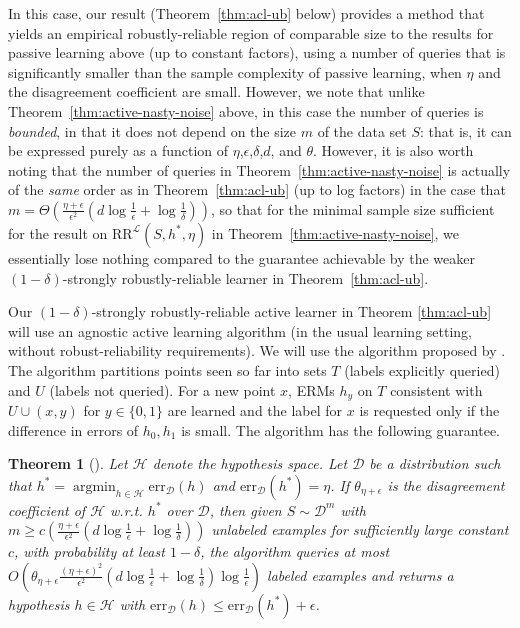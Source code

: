 \documentclass[11pt]{article}
\newcommand{\CR}{\text{RR}}
\newcommand{\err}{\mathrm{err}}
\newtheorem{theorem}{Theorem}[section]
\newcommand{\0}{\mathbf{0}}
\newcommand{\1}{\mathbf{1}}
\newcommand{\cD}{\mathcal{D}}
\newcommand{\cH}{\mathcal{H}}
\newcommand{\cL}{\mathcal{L}}
\DeclareMathOperator*{\argmin}{argmin}
\begin{document}
In this case, our result (Theorem~\ref{thm:acl-ub} below) provides a method that yields
an empirical robustly-reliable region of
comparable size to the results for passive
learning above (up to constant factors),
using a number of queries that is significantly
smaller than the sample complexity of passive learning,
when $\eta$ and the disagreement coefficient are
small.  However, we note that unlike
Theorem~\ref{thm:active-nasty-noise} above,
in this case the number of queries is
\emph{bounded}, in that it does not depend on
the size $m$ of the data set $S$:
that is, it can be expressed purely as a function
of
$\eta$,$\epsilon$,$\delta$,$d$, and $\theta$.
However, it is also worth noting that the number of queries
in Theorem~\ref{thm:active-nasty-noise} is
actually of the \emph{same} order as in Theorem~\ref{thm:acl-ub} (up to log factors)
in the case that
$m = \Theta\!\left( \frac{\eta+\epsilon}{\epsilon^2} \left( d \log\frac{1}{\epsilon}+\log\frac{1}{\delta}\right) \right)$,
so that for the minimal sample size sufficient for the
result on $\CR^{\cL}(S,h^*,\eta)$ in Theorem~\ref{thm:active-nasty-noise}, we essentially lose
nothing compared to the guarantee achievable by the
weaker $(1-\delta)$-strongly robustly-reliable learner
in Theorem~\ref{thm:acl-ub}.




Our $(1-\delta)$-strongly robustly-reliable active learner in Theorem \ref{thm:acl-ub} will use an agnostic active learning algorithm (in the usual learning setting, without robust-reliability requirements). We will use the algorithm proposed by \cite{dasgupta2007general}. The algorithm partitions points seen so far into sets $T$ (labels explicitly queried) and $U$ (labels not queried). For a new point $x$, ERMs $h_y$ on $T$ consistent with $U\cup(x,y)$ for $y\in\{0,1\}$ are learned and the label for $x$ is requested only if the difference in errors of $h_0,h_1$ is small. The algorithm has the following guarantee.

\begin{theorem}[\cite{dasgupta2007general}]\label{thm:dasgupta_aa}
Let $\cH$ denote the hypothesis space. Let ${\cD}$ be a distribution such that ${h}^*=\argmin_{h\in\cH}\err_\cD(h)$ and $\err_\cD(h^*)=\eta$. If ${\theta}_{\eta+\epsilon}$ is the disagreement coefficient of $\cH$ w.r.t. ${h}^*$ over ${\cD}$, then given ${S}\sim{\cD}^m$ with $m\geq c\left(\frac{\eta+\epsilon}{\epsilon^2}\left( d \log \frac{1}{\epsilon}+\log\frac{1}{\delta}\right) \right)$ unlabeled examples for sufficiently large constant $c$, with probability at least $1-\delta$, the algorithm queries at most $O\!\left( {\theta}_{\eta+\epsilon} \frac{(\eta+\epsilon)^2}{\epsilon^2}\left( d \log\frac{1}{\epsilon}+\log\frac{1}{\delta} \right)\log\frac{1}{\epsilon}  \right)$ labeled examples and returns a hypothesis ${h}\in\cH$ with  $\err_\cD({h})\le \err_\cD({h}^*)+\epsilon$.
\end{theorem}
\end{document}
